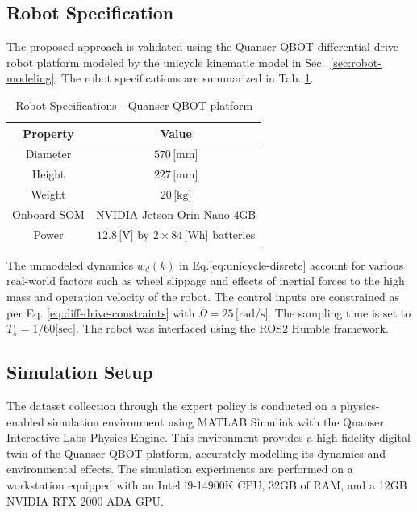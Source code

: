 \documentclass[letterpaper, 10 pt, conference]{ieeeconf}
\begin{document}
\subsection{Robot Specification}
The proposed approach is validated using the Quanser QBOT differential drive robot platform modeled by the unicycle kinematic model in Sec.~\ref{sec:robot-modeling}. The robot specifications are summarized in Tab. \ref{tab:robot_spec}.

\begin{table}[!ht]
  \centering
  \caption{Robot Specifications - Quanser QBOT platform}
  \label{tab:robot_spec}
  \begin{tabular}{|c|c|}
    \hline
    \textbf{Property} & \textbf{Value} \\
    \hline
    Diameter & $570 \, \text{[mm]}$ \\
    \hline
    Height & $227 \, \text{[mm]}$ \\
    \hline
    Weight & $20 \, \text{[kg]}$ \\
    \hline
    Onboard SOM & NVIDIA Jetson Orin Nano $4\text{GB}$ \\
    \hline
    Power & $12.8 \, \text{[V]}$ by $2 \times 84 \, \text{[Wh]}$ batteries \\
    \hline
  \end{tabular}
\end{table}

The unmodeled dynamics $w_d(k)$ in Eq.\eqref{eq:unicycle-disrete} account for various real-world factors such as wheel slippage and effects of inertial forces to the high mass and operation velocity of the robot. The control inputs are constrained as per Eq. \eqref{eq:diff-drive-constraints} with $\overline{\Omega}=25\,\text{[rad/s]}$. The sampling time is set to $T_s=1/60\text{[sec]}$. The robot was interfaced using the ROS$2$ Humble framework.

\subsection{Simulation Setup}

The dataset collection through the expert policy is conducted on a physics-enabled simulation environment using MATLAB Simulink with the Quanser Interactive Labs Physics Engine. This environment provides a high-fidelity digital twin of the Quanser QBOT platform, accurately modelling its dynamics and environmental effects.
The simulation experiments are performed on a workstation equipped with an Intel i9-14900K CPU, 32GB of RAM, and a 12GB NVIDIA RTX 2000 ADA GPU.
\end{document}
